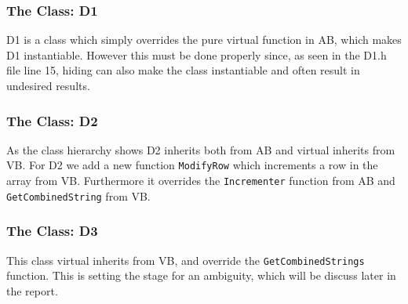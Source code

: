 \subsubsection{The Class: D1}
D1 is a class which simply overrides the pure virtual function in AB, which makes D1 instantiable. However this must be done properly since, as seen in the D1.h file line 15, hiding can also make the class instantiable and often result in undesired results.

\subsubsection{The Class: D2}
As the class hierarchy shows D2 inherits both from AB and virtual inherits from VB.
For D2 we add a new function \lstinline$ModifyRow$ which increments a row in the array from VB.
Furthermore it overrides the \lstinline$Incrementer$ function from AB and \lstinline$GetCombinedString$ from VB.

\subsubsection{The Class: D3}
This class virtual inherits from VB, and override the \lstinline$GetCombinedStrings$ function. This is setting the stage for an ambiguity, which will be discuss later in the report.

